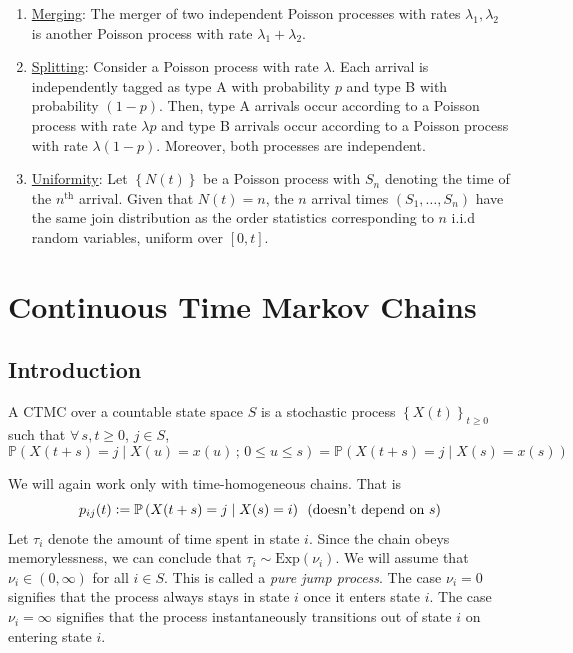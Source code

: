 \documentclass[12pt]{article}
\def\P{\mathbb{P}}
\theoremstyle{definition}
\begin{document}
    \begin{enumerate}
        \item \underline{Merging}: The merger of two independent Poisson processes with rates $\lambda_1, \lambda_2$ is another Poisson process with rate $\lambda_1 + \lambda_2$. 
        
        \item \underline{Splitting}: Consider a Poisson process with rate $\lambda$. Each arrival is independently tagged as type A with probability $p$ and type B with probability $(1-p)$. Then, type A arrivals occur according to a Poisson process with rate $\lambda p$ and type B arrivals occur according to a Poisson process with rate $\lambda(1-p)$. Moreover, both processes are independent.
        
        \item \underline{Uniformity}: Let $\left\{ N(t) \right\}$ be a Poisson process with $S_n$ denoting the time of the $n^{\text{th}}$ arrival. Given that $N(t) = n$, the $n$ arrival times $(S_1, \ldots, S_n)$ have the same join distribution as the order statistics corresponding to $n$ i.i.d random variables, uniform over $[0,t]$.
    \end{enumerate}
    
    \newpage
    
    \section{Continuous Time Markov Chains}
    
    \subsection{Introduction}
    
    \begin{defn}
        A CTMC over a countable state space $S$ is a stochastic process $\left\{ X(t) \right\}_{t \geq 0}$ such that $\forall \, s,t \geq 0$, $j \in S$, 
        \[
            \P \left( X(t+s) = j \mid X(u) = x(u) \, ;\, 0 \leq u \leq s \right) = \P \left( X(t+s) = j \mid X(s) = x(s) \right)
        \]  
    \end{defn}
    We will again work only with time-homogeneous chains. That is
    \[
        p_{ij}(t) \vcentcolon= \P \left( X(t+s) = j \mid X(s) = i \right) \, \text{ (doesn't depend on $s$)}
    \]
    Let $\tau_i$ denote the amount of time spent in state $i$. Since the chain obeys memorylessness, we can conclude that $\tau_i \sim \text{Exp}(\nu_i)$. We will assume that $\nu_i \in (0,\infty)$ for all $i \in S$. This is called a \emph{pure jump process}. The case $\nu_i = 0$ signifies that the process always stays in state $i$ once it enters state $i$. The case $\nu_i = \infty$ signifies that the process instantaneously transitions out of state $i$ on entering state $i$.
    
\end{document}
